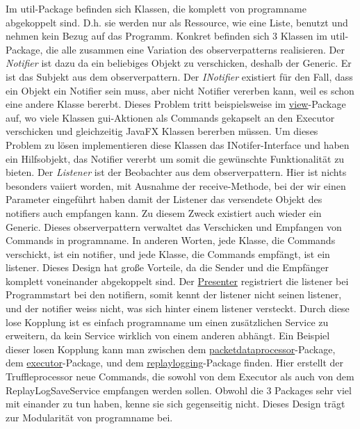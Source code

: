 \medskip
Im util-Package befinden sich Klassen, die komplett von \gls{programname} abgekoppelt
sind. D.h. sie werden nur als Ressource, wie eine Liste, benutzt und nehmen kein
Bezug auf das Programm.\newline
Konkret befinden sich 3 Klassen im util-Package, die alle zusammen eine
Variation des \gls{observerpattern}s realisieren. Der \textit{Notifier} ist dazu da
ein beliebiges Objekt zu verschicken, deshalb der Generic. Er ist das Subjekt aus
dem \gls{observerpattern}.
\newline
\newline
Der \textit{INotifier} existiert für den Fall, dass ein
Objekt ein Notifier sein muss, aber nicht Notifier vererben kann, weil es
schon eine andere Klasse bererbt. Dieses Problem tritt beispielsweise im
\hyperref[subsec:view]{view}-Package auf, wo viele Klassen \gls{gui}-Aktionen als Commands
gekapselt an den Executor verschicken und gleichzeitig JavaFX Klassen bererben müssen.
Um dieses Problem zu lösen implementieren diese Klassen das INotifer-Interface
und haben ein Hilfsobjekt, das Notifier vererbt um somit die gewünschte Funktionalität zu
bieten.
\newline
\newline
Der \textit{Listener} ist der Beobachter aus dem \gls{observerpattern}. Hier ist nichts
besonders vaiiert worden, mit Ausnahme der receive-Methode, bei der wir einen Parameter eingeführt
haben damit der Listener das versendete Objekt des \gls{notifier}s auch empfangen kann.
Zu diesem Zweck existiert auch wieder ein Generic.
\newline
\newline
Dieses \gls{observerpattern} verwaltet das Verschicken und Empfangen von Commands in
\gls{programname}. In anderen Worten, jede Klasse, die Commands verschickt, ist ein
\gls{notifier}, und jede Klasse, die Commands empfängt, ist ein \gls{listener}. Dieses Design
hat große Vorteile, da die Sender und die Empfänger komplett voneinander abgekoppelt
sind. Der \hyperref[subsec:presenter]{Presenter} registriert die \gls{listener} bei Programmstart
bei den \gls{notifier}n, somit kennt der \gls{listener} nicht seinen \gls{listener}, und der
\gls{notifier} weiss nicht, was sich hinter einem \gls{listener} versteckt. Durch diese lose
Kopplung ist es einfach \gls{programname} um einen zusätzlichen Service zu erweitern,
da kein Service wirklich von einem anderen abhängt.
\newline
\newline
Ein Beispiel dieser losen Kopplung kann man zwischen dem
\hyperref[subsubsec:packetdataprocessor]{packetdataprocessor}-Package, dem
\hyperref[subsubsec:executor]{executor}-Package, und dem
\hyperref[subsubsec:replaylogging]{replaylogging}-Package finden. Hier erstellt
der Truffleprocessor neue Commands, die sowohl von dem Executor als auch von dem
ReplayLogSaveService empfangen werden sollen. Obwohl die 3 Packages sehr viel
mit einander zu tun haben, kenne sie sich gegenseitig nicht. Dieses Design
trägt zur Modularität von \gls{programname} bei.


